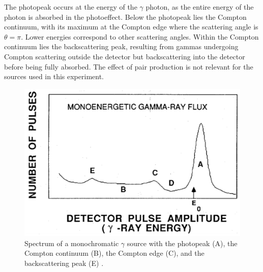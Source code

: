 \noindent
The photopeak occurs at the energy of the $\gamma$ photon, as the entire 
energy of the photon is absorbed in the photoeffect. Below the photopeak 
lies the Compton continuum, with its maximum at the Compton edge where the 
scattering angle is $\theta=\pi$. Lower energies correspond to other 
scattering angles. Within the Compton continuum lies the backscattering 
peak, resulting from gammas undergoing Compton scattering outside the 
detector but backscattering into the detector before being fully absorbed.
The effect of pair production is not relevant for the sources used in this 
experiment.
\begin{figure}
    \centering
    \includegraphics[scale=0.6]{pictures/spectrum.png}
    \caption{Spectrum of a monochromatic $\gamma$ source with the 
    photopeak (A), the Compton continuum (B), the Compton edge (C), 
    and the backscattering peak (E) \cite{Smith1997GammaRayD}.}
    \label{fig:spectrum}
\end{figure}